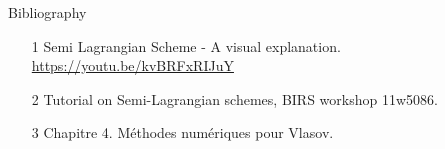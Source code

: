 \begin{frame}{Bibliography}

    \begin{itemize}
        \item[1] Semi Lagrangian Scheme - A visual explanation. \url{https://youtu.be/kvBRFxRIJuY}
        \item[2] Tutorial on Semi-Lagrangian schemes, BIRS workshop 11w5086.
        \item[3] Chapitre 4. Méthodes numériques pour Vlasov.

    \end{itemize}
    
\end{frame}